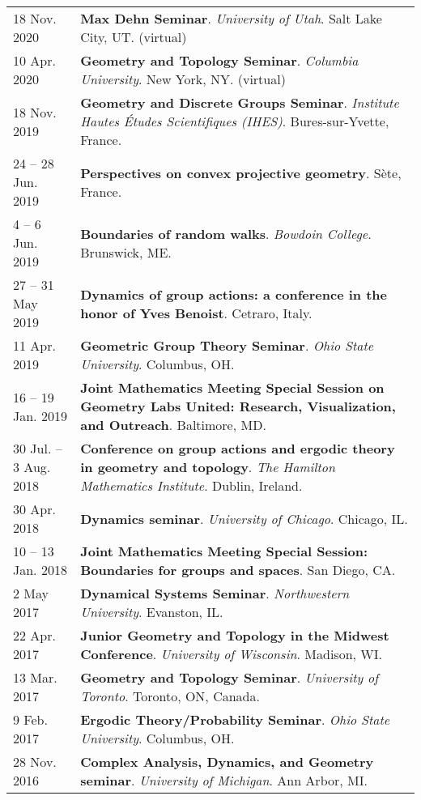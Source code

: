 \begin{center}
{\begin{longtable}{p{}  p{}}
18 Nov.  2020 & \textbf{Max Dehn Seminar}. \textit{University of Utah}.  Salt Lake City, UT. (virtual) \\ 
10 Apr.  2020 & \textbf{Geometry and Topology Seminar}. \textit{Columbia University}.  New York, NY. (virtual) \\ 
18 Nov.  2019 & \textbf{Geometry and Discrete Groups Seminar}. \textit{Institute Hautes \'Etudes Scientifiques (IHES)}.  Bures-sur-Yvette, France.  \\ 
24  -- 28 Jun.  2019 & \textbf{Perspectives on convex projective geometry}.  S\`ete, France.  \\ 
4  -- 6 Jun.  2019 & \textbf{Boundaries of random walks}. \textit{Bowdoin College}.  Brunswick, ME.  \\ 
27  -- 31 May  2019 & \textbf{Dynamics of group actions: a conference in the honor of Yves Benoist}.  Cetraro, Italy.  \\ 
11 Apr.  2019 & \textbf{Geometric Group Theory Seminar}. \textit{Ohio State University}.  Columbus, OH.  \\ 
16  -- 19 Jan.  2019 & \textbf{Joint Mathematics Meeting Special Session on Geometry Labs United: Research, Visualization, and Outreach}.  Baltimore, MD.  \\ 
30 Jul.  -- 3 Aug.  2018 & \textbf{Conference on group actions and ergodic theory in geometry and topology}. \textit{The Hamilton Mathematics Institute}.  Dublin, Ireland.  \\ 
30 Apr.  2018 & \textbf{Dynamics seminar}. \textit{University of Chicago}.  Chicago, IL.  \\ 
10  -- 13 Jan.  2018 & \textbf{Joint Mathematics Meeting Special Session: Boundaries for groups and spaces}.  San Diego, CA.  \\ 
2 May  2017 & \textbf{Dynamical Systems Seminar}. \textit{Northwestern University}.  Evanston, IL.  \\ 
22 Apr.  2017 & \textbf{Junior Geometry and Topology in the Midwest Conference}. \textit{University of Wisconsin}.  Madison, WI.  \\ 
13 Mar.  2017 & \textbf{Geometry and Topology Seminar}. \textit{University of Toronto}.  Toronto, ON, Canada.  \\ 
9 Feb.  2017 & \textbf{Ergodic Theory/Probability Seminar}. \textit{Ohio State University}.  Columbus, OH.  \\ 
28 Nov.  2016 & \textbf{Complex Analysis, Dynamics, and Geometry seminar}. \textit{University of Michigan}.  Ann Arbor, MI.  \\ 

\end{longtable}}
\end{center}
